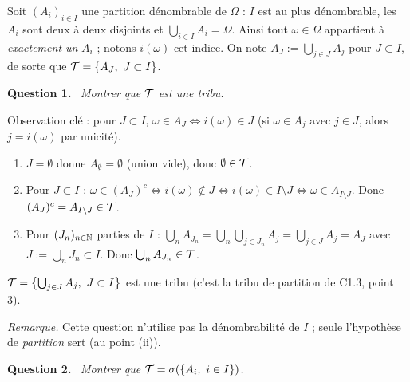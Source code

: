 \documentclass[11pt,a4paper]{article}
\newcommand{\question}[1]{\par\medskip\noindent\textbf{Question #1.}~}
\begin{document}
\begin{exo}
Soit $(A_i)_{i\in I}$ une partition dénombrable de $\Omega$ : $I$ est au plus dénombrable, les $A_i$ sont deux à deux disjoints
et $\bigcup_{i\in I}A_i=\Omega$. Ainsi tout $\omega\in\Omega$ appartient à \emph{exactement un} $A_i$ ; notons $i(\omega)$ cet indice.
On note $A_J:=\bigcup_{j\in J}A_j$ pour $J\subset I$, de sorte que $\mathcal{T}=\{A_J,\ J\subset I\}$.

\question{1} \emph{Montrer que $\mathcal{T}$ est une tribu.}

Observation clé : pour $J\subset I$, $\omega\in A_J\iff i(\omega)\in J$ (si $\omega\in A_j$ avec $j\in J$, alors $j=i(\omega)$ par unicité).
\begin{enumerate}[label=(\roman*)]
  \item $J=\emptyset$ donne $A_\emptyset=\emptyset$ (union vide), donc $\emptyset\in\mathcal{T}$.
  \item Pour $J\subset I$ : $\omega\in(A_J)^c\iff i(\omega)\notin J\iff i(\omega)\in I\setminus J\iff\omega\in A_{I\setminus J}$.
  Donc $(A_J)^c=A_{I\setminus J}\in\mathcal{T}$.
  \item Pour $(J_n)_{n\in\mathbb{N}}$ parties de $I$ : $\bigcup_nA_{J_n}=\bigcup_n\bigcup_{j\in J_n}A_j=\bigcup_{j\in J}A_j=A_J$ avec
  $J:=\bigcup_nJ_n\subset I$. Donc $\bigcup_nA_{J_n}\in\mathcal{T}$.
\end{enumerate}
\begin{resultat}
$\mathcal{T}=\bigl\{\bigcup_{j\in J}A_j,\ J\subset I\bigr\}$ est une tribu (c'est la tribu de partition de C1.3, point 3).
\end{resultat}
\textit{Remarque.} Cette question n'utilise pas la dénombrabilité de $I$ ; seule l'hypothèse de \emph{partition} sert (au point (ii)).

\question{2} \emph{Montrer que $\mathcal{T}=\sigma(\{A_i,\ i\in I\})$.}


\end{exo}
\end{document}
